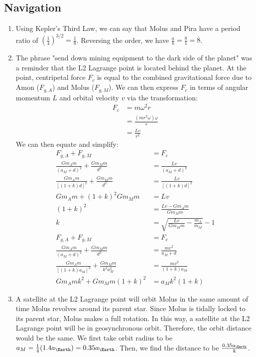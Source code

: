 \documentclass{article}
\begin{document}
\subsection{Navigation}
\begin{enumerate}
\item Using Kepler's Third Law, we can say that Molus and Pira have a period ratio of $(\frac{1}{4})^{3/2}=\frac{1}{8}$. Reversing the order, we have $\frac{a}{b}=\frac{8}{1}=8$.
\item The phrase "send down mining equipment to the dark side of the planet" was a reminder that the L2 Lagrange point is located behind the planet. At the point, centripetal force $F_c$ is equal to the combined gravitational force due to Amon ($F_{g,A}$) and Molus ($F_{g,M}$). We can then express $F_c$ in terms of angular momentum $L$ and orbital velocity $v$ via the transformation:
\begin{equation}
\begin{split}
F_c&=m\omega^2r\\
&=\frac{(mr^2\omega)\omega}{r}\\
&=\frac{Lv}{r^2}
\end{split}
\end{equation}
We can then equate and simplify:
\begin{equation}
\begin{split}
F_{g,A}+F_{g,M}&=F_c\\
\frac{Gm_Am}{(a_M+d)^2}+\frac{Gm_Mm}{d^2}&=\frac{Lv}{(a_M+d)^2}\\
\frac{Gm_Am}{[(1+k)d]^2}+\frac{Gm_Mm}{d^2}&=\frac{Lv}{[(1+k)d]^2}\\
Gm_Am+(1+k)^2Gm_Mm&=Lv\\
(1+k)^2&=\frac{Lv-Gm_Am}{Gm_Mm}\\
k&=\sqrt{\frac{Lv}{Gm_Mm}-\frac{m_A}{m_M}}-1\\
F_{g,A}+F_{g,M}&=F_c\\
\frac{Gm_Am}{(a_M+d)^2}+\frac{Gm_Mm}{d^2}&=\frac{mv^2}{a_M+d}\\
\frac{Gm_Am}{[(1+k)a_M]^2}+\frac{Gm_Mm}{k^2a_M^2}&=\frac{mv^2}{(1+k)a_M}\\
Gm_Amk^2+Gm_Mm(1+k)^2&=a_Mk^2(1+k)
\end{split}
\end{equation}
\item A satellite at the L2 Lagrange point will orbit Molus in the same amount of time Molus revolves around its parent star. Since Molus is tidally locked to its parent star, Molus makes a full rotation. In this way, a satellite at the L2 Lagrange point will be in geosynchronous orbit. Therefore, the orbit distance would be the same. We first take orbit radius to be $a_M=\frac{1}{4}(1.4a_\Earth)=0.35a_\Earth$. Then, we find the distance to be $\frac{0.35a_\Earth}{k}$.
\end{enumerate}
\end{document}
